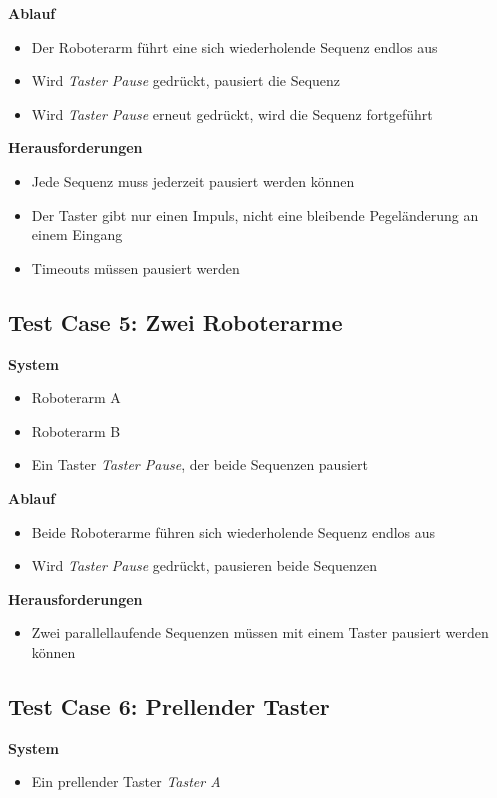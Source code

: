 \textbf{Ablauf}
\begin{itemize}
\item Der Roboterarm führt eine sich wiederholende Sequenz endlos aus
\item Wird \textit{Taster Pause} gedrückt, pausiert die Sequenz
\item Wird \textit{Taster Pause} erneut gedrückt, wird die Sequenz fortgeführt
\end{itemize}

\textbf{Herausforderungen}
\begin{itemize}
\item Jede Sequenz muss jederzeit pausiert werden können
\item Der Taster gibt nur einen Impuls, nicht eine bleibende Pegeländerung an einem Eingang
\item Timeouts müssen pausiert werden
\end{itemize}


\subsection{Test Case 5: Zwei Roboterarme}
\textbf{System}
\begin{itemize}
\item Roboterarm A
\item Roboterarm B
\item Ein Taster \textit{Taster Pause}, der beide Sequenzen pausiert
\end{itemize}

\textbf{Ablauf}
\begin{itemize}
\item Beide Roboterarme führen sich wiederholende Sequenz endlos aus
\item Wird \textit{Taster Pause} gedrückt, pausieren beide Sequenzen
\end{itemize}

\textbf{Herausforderungen}
\begin{itemize}
\item Zwei parallellaufende Sequenzen müssen mit einem Taster pausiert werden können
\end{itemize}


\subsection{Test Case 6: Prellender Taster}
\textbf{System}
\begin{itemize}
\item Ein prellender Taster \textit{Taster A}
\end{itemize}

